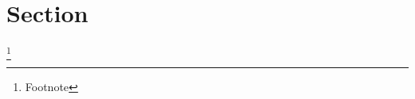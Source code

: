 \documentclass[bibliogrephy=numbered, colophon=false]{tufte-style-thesis}
\begin{document}
\section{Section}

\lipsum\footnote{Footnote}
\end{document}
